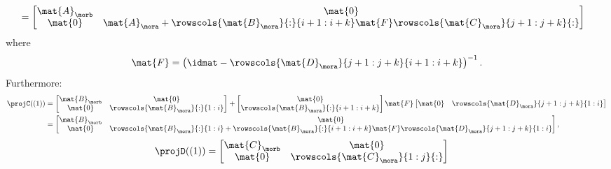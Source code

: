 {\begin{example}
\begin{equation*}
\begin{aligned}
                        & =\begin{bmatrix}\mat{A}_\morb & \mat{0}                                                                                         \\
               \mat{0}       & \mat{A}_\mora + \rowscols{\mat{B}_\mora}{:}{i+1:i+k}\mat{F}\rowscols{\mat{C}_\mora}{j+1:j+k}{:}
                           \end{bmatrix}
        \end{aligned}
    \end{equation*}
    where
    \begin{equation*}
        \mat{F}=\left(\idmat - \rowscols{\mat{D}_\mora}{j+1:j+k}{i+1:i+k}\right)^{-1}.
    \end{equation*}
    Furthermore:
    \begin{equation*}
        \begin{aligned}
            \projC((1)) & =\begin{bmatrix} \mat{B}_\morb&\mat{0}\\ \mat{0}&\rowscols{\mat{B}_\mora}{:}{1:i}\end{bmatrix}
            + \begin{bmatrix} \mat{0}\\ \rowscols{\mat{B}_\mora}{:}{i+1:i+k} \end{bmatrix}\mat{F}\begin{bmatrix} \mat{0}&\rowscols{\mat{D}_\mora}{j+1:j+k}{1:i}\end{bmatrix} \\
                        & =\begin{bmatrix}
                               \mat{B}_\morb & \mat{0}                                                                                                             \\
                               \mat{0}       & \rowscols{\mat{B}_\mora}{:}{1:i}+ \rowscols{\mat{B}_\mora}{:}{i+1:i+k}\mat{F}\rowscols{\mat{D}_\mora}{j+1:j+k}{1:i}
                           \end{bmatrix},
        \end{aligned}
    \end{equation*}
    \begin{equation*}
        \begin{aligned}
            \projD((1)) & =\begin{bmatrix} \mat{C}_\morb&\mat{0}\\ \mat{0}&\rowscols{\mat{C}_\mora}{1:j}{:}\end{bmatrix}

\end{aligned}
\end{equation*}
\end{example}}

